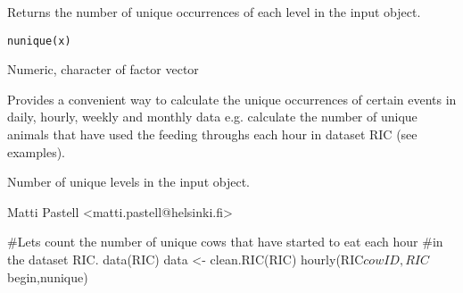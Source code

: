 \begin{Description}\relax
Returns the number of unique occurrences of each level in the input object.
\end{Description}
\begin{Usage}
\begin{verbatim}
nunique(x)
\end{verbatim}
\end{Usage}
\begin{Arguments}
\begin{ldescription}
\item[\code{x}] Numeric, character of factor vector
\end{ldescription}
\end{Arguments}
\begin{Details}\relax
Provides a convenient way to calculate the unique occurrences of certain
events in daily, hourly, weekly and monthly data e.g. calculate the
number of unique animals that have used the feeding throughs each hour
in dataset RIC (see examples).
\end{Details}
\begin{Value}
Number of unique levels in the input object.
\end{Value}
\begin{Author}\relax
Matti Pastell <matti.pastell@helsinki.fi>
\end{Author}
\begin{Examples}
\begin{ExampleCode}
#Lets count the number of unique cows that have started to eat each hour
#in the dataset RIC.
data(RIC)
data <- clean.RIC(RIC)
hourly(RIC$cowID,RIC$begin,nunique)

\end{ExampleCode}
\end{Examples}

